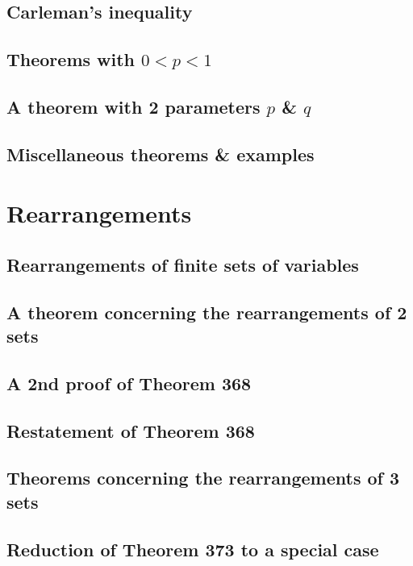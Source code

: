 \documentclass[oneside]{book}
\numberwithin{equation}{section}
\begin{document}
\subsection{Carleman's inequality}

\subsection{Theorems with $0 < p < 1$}

\subsection{A theorem with 2 parameters $p$ \& $q$}

\subsection{Miscellaneous theorems \& examples}


\section{Rearrangements}

\subsection{Rearrangements of finite sets of variables}

\subsection{A theorem concerning the rearrangements of 2 sets}

\subsection{A 2nd proof of Theorem 368}

\subsection{Restatement of Theorem 368}

\subsection{Theorems concerning the rearrangements of 3 sets}

\subsection{Reduction of Theorem 373 to a special case}
\end{document}
